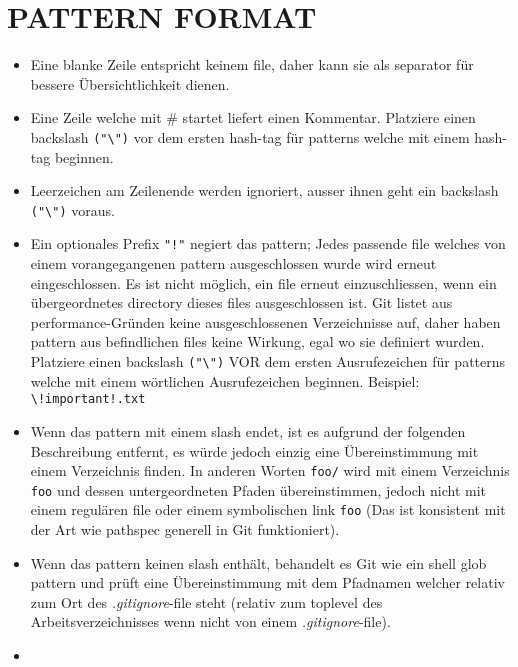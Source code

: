 \section*{PATTERN FORMAT}
\begin{itemize}
\item Eine blanke Zeile entspricht keinem file, daher kann sie als separator für bessere Übersichtlichkeit dienen.
\item Eine Zeile welche mit \# startet liefert einen Kommentar. Platziere einen backslash \verb|("\")| vor dem ersten hash-tag für patterns welche mit einem hash-tag beginnen.
\item Leerzeichen am Zeilenende werden ignoriert, ausser ihnen geht ein backslash \verb|("\")| voraus.
\item Ein optionales Prefix \verb|"!"| negiert das pattern; Jedes passende file welches von einem vorangegangenen pattern ausgeschlossen wurde wird erneut eingeschlossen. Es ist nicht möglich, ein file erneut einzuschliessen, wenn ein übergeordnetes directory dieses files ausgeschlossen ist. Git listet aus performance-Gründen keine ausgeschlossenen Verzeichnisse auf, daher haben pattern aus befindlichen files keine Wirkung, egal wo sie definiert wurden. Platziere einen backslash \verb|("\")| VOR dem ersten Ausrufezeichen für patterns welche mit einem wörtlichen Ausrufezeichen beginnen. Beispiel: \verb|\!important!.txt|
\item Wenn das pattern mit einem slash endet, ist es aufgrund der folgenden Beschreibung entfernt, es würde jedoch einzig eine Übereinstimmung mit einem Verzeichnis finden. In anderen Worten \verb|foo/| wird mit einem Verzeichnis \verb|foo| und dessen untergeordneten Pfaden übereinstimmen, jedoch nicht mit einem regulären file oder einem symbolischen link \verb|foo| (Das ist konsistent mit der Art wie pathspec generell in Git funktioniert).
\item Wenn das pattern keinen slash enthält, behandelt es Git wie ein shell glob pattern und prüft eine Übereinstimmung mit dem Pfadnamen welcher relativ zum Ort des \textit{.gitignore}-file steht (relativ zum toplevel des Arbeitsverzeichnisses wenn nicht von einem \textit{.gitignore}-file).
\item 
\end{itemize}